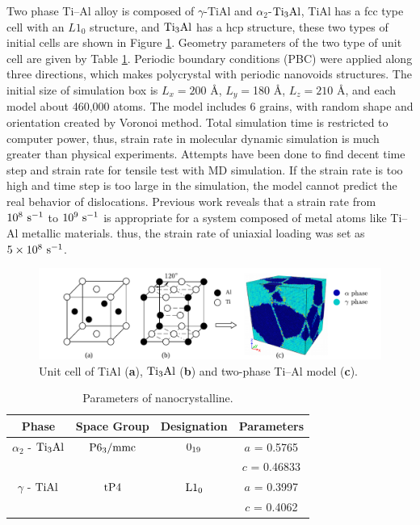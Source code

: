 \documentclass[materials,article,accept,moreauthors,pdftex,10pt,a4paper]{Definitions/mdpi}
\begin{document}
Two phase Ti--Al alloy is composed of $\gamma $-TiAl and $\alpha_2$-$\rm Ti_3Al$, TiAl has a fcc type cell with an $L1_0$ structure, and $\rm Ti_3Al$ has a hcp structure, these two types of initial cells are shown in Figure \ref{fig:tial-cell}. Geometry parameters of the two type of unit cell are given by Table \ref{tab:lattice_parameter}. Periodic boundary conditions (PBC) were applied along three directions, which makes polycrystal with periodic nanovoids structures. The initial size of simulation box is $L_x =200$ \si{\angstrom}, $L_y = $180 \si{\angstrom}, $L_z = 210$ \si{\angstrom}, and each model  about 460,000 atoms. The model includes 6 grains, with random shape and orientation created by Voronoi method. Total simulation time is restricted to computer power, thus, strain rate in molecular dynamic simulation is much greater than physical experiments. Attempts have been done to find decent time step and strain rate for tensile test with MD simulation. If the strain rate is too high and time step is too large in the simulation, the model cannot predict the real behavior of dislocations.  Previous work \cite{Zhu2008,Wu2016}  reveals that a strain rate from  $10^8\ \rm{s}^{-1}$ to $10^9\ \rm{s}^{-1}$ is appropriate for a system composed of metal atoms like Ti--Al metallic materials. thus, the strain rate of uniaxial loading was set as $5\times10^8\ \rm{s}^{-1}$.

\begin{figure}[H]
\centering
\includegraphics[width=1\linewidth]{img/modeling}
\caption{Unit cell of \rm{TiAl} (\textbf{a}), $\rm{Ti_3Al}$ (\textbf{b}) and two-phase Ti--Al model (\textbf{c}).}
\label{fig:tial-cell}
\end{figure}
\unskip
\begin{table}[H]
\caption{Parameters of nanocrystalline.}
\centering
\begin{tabular}{cccc}
\toprule
\textbf{Phase}			& \textbf{Space Group}		& \textbf{Designation} 		& \textbf{Parameters} \\
\midrule
$\alpha_2$ - $\rm{Ti_3Al}$		& $\rm P6_3/mmc$ 	& $\rm 0_{19}$ 		& $a$ = 0.5765 \\
&					&					& $c$ = 0.46833 \\\midrule
$\gamma$ - $\rm{TiAl}$ 		& $\rm tP4$ 		& $\rm L1_0$		& $a$ = 0.3997 \\
&					&					& $c$ = 0.4062 \\
\bottomrule
\end{tabular}
\label{tab:lattice_parameter}
\end{table}
\end{document}
